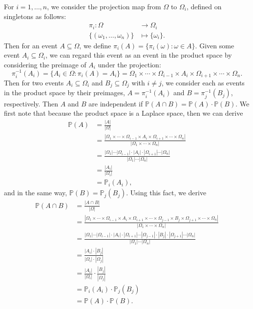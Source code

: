 \documentclass[12pt]{article}
\renewcommand{\P}{\mathbb{P}}
\begin{document}
For $i=1,\dots,n$, we consider the projection map from $\Omega$ to $\Omega_i$, defined on singletons as follows:
\begin{align*}
    \pi_i : \Omega &\to \Omega_i \\
    \{(\omega_1,\dots,\omega_n)\} &\mapsto \{\omega_i\}.
\end{align*}
Then for an event $A \subseteq \Omega$, we define $\pi_i(A) = \{\pi_i(\omega) : \omega\in A\}$. Given some event $A_i\subseteq \Omega_i$, we can regard this event as an event in the product space by considering the preimage of $A_i$ under the projection:
\[\pi_i^{-1}(A_i) = \{A_i\in\Omega : \pi_i(A) = A_i\} = \Omega_1 \times \cdots \times \Omega_{i-1} \times A_i \times \Omega_{i+1} \times \cdots \times \Omega_n.\]
Then for two events $A_i\subseteq\Omega_i$ and $B_j\subseteq\Omega_j$ with $i\ne j$, we consider each as events in the product space by their preimages, $A = \pi_i^{-1}(A_i)$ and $B = \pi_j^{-1}(B_j)$, respectively. Then $A$ and $B$ are independent if $\P(A\cap B) = \P(A)\cdot \P(B)$. We first note that because the product space is a Laplace space, then we can derive
\begin{align*}
    \P(A)
        &= \frac{|A|}{|\Omega|} \\
        &= \frac{|\Omega_1 \times \cdots \times \Omega_{i-1} \times A_i \times \Omega_{i+1} \times \cdots \times \Omega_n|}{|\Omega_1 \times \cdots \times \Omega_n|} \\
        &= \frac{|\Omega_1| \cdots |\Omega_{i-1}| \cdot |A_i| \cdot |\Omega_{i+1}| \cdots |\Omega_n|}{|\Omega_1| \cdots |\Omega_n|} \\
        &= \frac{|A_i|}{|\Omega_i|} \\
        &= \P_i(A_i),
\end{align*}
and in the same way, $\P(B) = \P_j(B_j)$. Using this fact, we derive
\begin{align*}
    \P(A\cap B)
        &= \frac{|A\cap B|}{|\Omega|} \\
        &= \frac{|\Omega_1 \times \cdots \times \Omega_{i-1} \times A_i \times \Omega_{i+1} \times \cdots \times \Omega_{j-1} \times B_j \times \Omega_{j+1} \times \cdots \times \Omega_n|}{|\Omega_1 \times \cdots \times \Omega_n|} \\
        &= \frac{|\Omega_1| \cdots |\Omega_{i-1}| \cdot |A_i| \cdot |\Omega_{i+1}| \cdots |\Omega_{j-1}| \cdot |B_j| \cdot |\Omega_{j+1}| \cdots |\Omega_n|}{|\Omega_1| \cdots |\Omega_n|} \\
        &= \frac{|A_i|\cdot |B_j|}{|\Omega_i|\cdot |\Omega_j|} \\
        &= \frac{|A_i|}{|\Omega_i|} \cdot \frac{|B_j|}{|\Omega_j|} \\
        &= \P_i(A_i) \cdot \P_j(B_j) \\
        &= \P(A) \cdot \P(B).
\end{align*}
\end{document}
